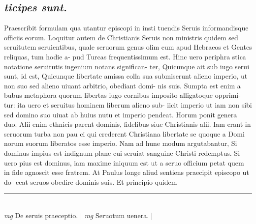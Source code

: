 \documentclass{article}
\begin{document}
\begin{pages}
\subsection*{\textit{ticipes sunt. }}\pstart Praescribit formulam qua utantur episcopi in insti tuendis Seruis informandisque officiis eorum. Loquitur autem de Christianis Seruis non ministris quidem sed seruitutem seruientibus, quale seruorum genus olim cum apud Hebraeos et Gentes reliquas, tum hodie a- pud Turcas frequentissimum est. Hinc uero periphra stica notatione seruitutis ingenium notans significan- ter, Quicunque ait sub iugo serui sunt, id est, Quicunque  libertate amissa colla sua submiserunt alieno imperio, ut non suo sed alieno uiuant arbitrio, obediant domi- nis suis. Sumpta est enim a bubus metaphora quorum libertas iugo cornibus imposito alligatoque opprimi- tur: ita uero et seruitus hominem liberum alieno sub- iicit imperio ut iam non sibi sed domino suo uiuat ab huius nutu et imperio pendeat. Horum ponit genera duo. Alii enim ethnicis parent dominis, fidelibus siue Christianis alii. Iam erant in seruorum turba non pau ci qui crederent Christiana libertate se quoque a Domi norum suorum liberatos esse imperio. Nam ad hune modum argutabantur, Si dominus impius est indignum plane cui seruiat sanguine Christi redemptus. Si uero pius est dominus, iam maxime iniquum est ut a seruo officium petat quem in fide agnoscit esse fratrem. At Paulus longe aliud sentiens praecipit episcopo ut do- ceat seruos obedire dominis suis. Et principio quidem  \pend
\vspace{0.5cm}\noindent
\vspace{0.2cm}\rule{1cm}{0.2pt}\\ 
\hspace{0.2cm}\textit{mg}
\footnotesize De seruis praeceptio. 
\normalsize| 
\hspace{0.2cm}\textit{mg}
\footnotesize Seruotum uenera. 
\normalsize| 

\end{pages}
\end{document}
